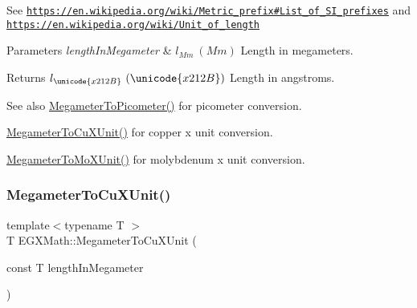 See \href{https://en.wikipedia.org/wiki/Metric_prefix#List_of_SI_prefixes}{\tt https\+://en.\+wikipedia.\+org/wiki/\+Metric\+\_\+prefix\#\+List\+\_\+of\+\_\+\+S\+I\+\_\+prefixes} and \href{https://en.wikipedia.org/wiki/Unit_of_length}{\tt https\+://en.\+wikipedia.\+org/wiki/\+Unit\+\_\+of\+\_\+length} 
\begin{DoxyParams}{Parameters}
{\em length\+In\+Megameter} & $ l_{Mm}\ (Mm)$ Length in megameters. \\
\hline
\end{DoxyParams}
\begin{DoxyReturn}{Returns}
$ l_{\unicode{x212B}}\ (\unicode{x212B})$ Length in angstroms. 
\end{DoxyReturn}
\begin{DoxySeeAlso}{See also}
\mbox{\hyperlink{group___e_g_x_math-_conversions-_length_conversions-_s_i-_megameter-_s_i_ga0f6585bdcd16b6748b6c4d9116dd955c}{Megameter\+To\+Picometer()}} for picometer conversion. 

\mbox{\hyperlink{group___e_g_x_math-_conversions-_length_conversions-_s_i-_megameter-_non-_s_i_gae44ce2fd3e740a5aec1546ed10c83447}{Megameter\+To\+Cu\+X\+Unit()}} for copper x unit conversion. 

\mbox{\hyperlink{group___e_g_x_math-_conversions-_length_conversions-_s_i-_megameter-_non-_s_i_ga134a9fb2603b93c739c4ee58864f69c6}{Megameter\+To\+Mo\+X\+Unit()}} for molybdenum x unit conversion. 
\end{DoxySeeAlso}
\mbox{\label{group___e_g_x_math-_conversions-_length_conversions-_s_i-_megameter-_non-_s_i_gae44ce2fd3e740a5aec1546ed10c83447}} 
\subsubsection{\texorpdfstring{Megameter\+To\+Cu\+X\+Unit()}{MegameterToCuXUnit()}}
{\footnotesize\ttfamily template$<$typename T $>$ \\
T E\+G\+X\+Math\+::\+Megameter\+To\+Cu\+X\+Unit (\begin{DoxyParamCaption}\item[{const T}]{length\+In\+Megameter }\end{DoxyParamCaption})}




